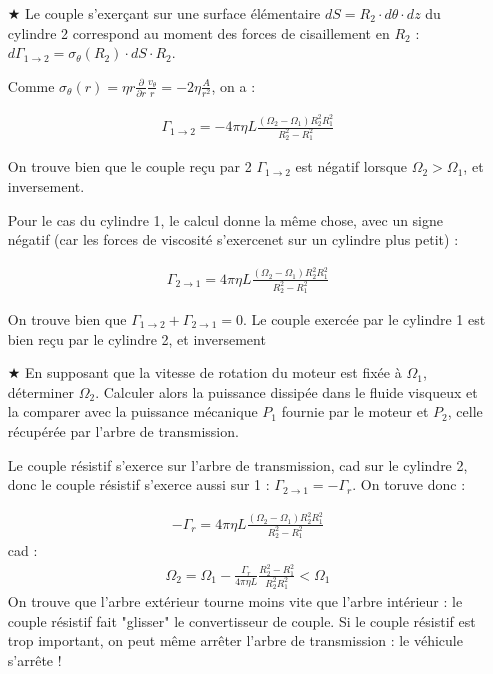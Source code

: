 \documentclass{report}
\begin{document}
\begin{itemize}
	\item[$\bigstar$] Le couple s'exerçant sur une surface élémentaire $dS=R_2\cdot d\theta\cdot  dz$ du cylindre 2 correspond au moment des forces de cisaillement en $R_2$ : $d\Gamma_{1\rightarrow2} = \sigma_\theta(R_2)\cdot dS\cdot R_2$.
	
	Comme $\sigma_\theta(r)=\eta r \frac{\partial}{\partial r}\frac{v_\theta}{r}=-2\eta\frac{A}{r^2}$, on a :
	
	\begin{align*}
		\Gamma_{1\rightarrow2}	 = -4\pi\eta L\frac{(\Omega_2-\Omega_1)R_2^2R_1^2}{R_2^2-R_1^2}
	\end{align*}
	
	On trouve bien que le couple reçu par 2 $\Gamma_{1\rightarrow2}$ est négatif lorsque $\Omega_2>\Omega_1$, et inversement.
	
	Pour le cas du cylindre 1, le calcul donne la même chose, avec un signe négatif (car les forces de viscosité s'exercenet sur un cylindre plus petit) :
	
		\begin{align*}
		\Gamma_{2\rightarrow1}	 =4\pi\eta L\frac{(\Omega_2-\Omega_1)R_2^2R_1^2}{R_2^2-R_1^2}
	\end{align*}
	
	On trouve bien que $\Gamma_{1\rightarrow2} + \Gamma_{2\rightarrow1}	=0$. Le couple exercée par le cylindre 1 est bien reçu par le cylindre 2, et inversement
	
	\item[$\bigstar$] En supposant que la vitesse de rotation du moteur est fixée à $\Omega_1$, déterminer $\Omega_2$. Calculer alors la puissance dissipée dans le fluide visqueux et la comparer avec la puissance mécanique $P_1$ fournie par le moteur et $P_2$, celle récupérée par l'arbre de transmission.
	
	Le couple résistif s'exerce sur l'arbre de transmission, cad sur le cylindre 2, donc le couple résistif s'exerce aussi sur 1 : $\Gamma_{2\rightarrow1} = -\Gamma_r$. On toruve donc :
	
	\begin{align*}
		-\Gamma_{r}	 =4\pi\eta L\frac{(\Omega_2-\Omega_1)R_2^2R_1^2}{R_2^2-R_1^2}
	\end{align*}
	cad :
	\begin{align*}
		\Omega_2 =\Omega_1 - \frac{\Gamma_{r}}{4\pi\eta L}\frac{R_2^2-R_1^2}{R_2^2R_1^2}<\Omega_1
	\end{align*}
	On trouve que l'arbre extérieur tourne moins vite que l'arbre intérieur : le couple résistif fait "glisser" le convertisseur de couple. Si le couple résistif est trop important, on peut même arrêter l'arbre de transmission : le véhicule s'arrête ! 
	

\end{itemize}
\end{document}
